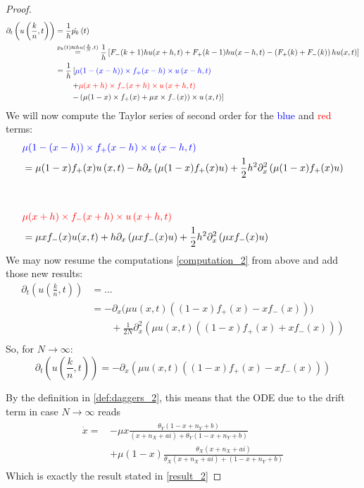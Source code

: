 \begin{proof}
\begin{align}
\begin{split}
	\partial_t \left(u\left(\frac{k}{n}, t\right)\right) &= \frac{1}{h}\dot{p_k}\left(t\right)\\
	&\overset{p_k(t) \approx hu(\frac{k}{N},t)}{=} \frac{1}{h}\left[F_-(k+1)hu(x+h,t) + F_+(k-1)hu(x-h,t) - \left(F_+(k)+F_-(k)\right)hu(x,t)\right]\\
	&= \frac{1}{h}\left[\textcolor{blue}{\mu(1-(x-h))\times f_+(x-h) \times u\left(x-h,t \right)}\right.\\
		&\qquad\left. + \textcolor{red}{\mu(x+h)\times f_-(x+h)\times u\left(x+h,t\right)}\right.\\
		&\qquad\left.- \left(\mu(1-x)\times f_+(x) + \mu x\times f_-(x)\right)\times u\left(x,t\right)\right] 
	\end{split}
	\end{align}
	We will now compute the Taylor series of second order for the \textcolor{blue}{blue} and \textcolor{red}{red} terms:
	\begin{align*}
	&\textcolor{blue}{\mu(1-(x-h))\times f_+(x-h) \times u\left(x-h,t \right)}\\
	&= \mu(1-x)f_+(x) u\left(x,t\right) - h\partial_x \left(\mu(1-x)f_+(x)u\right)+\frac{1}{2}h^2\partial^2_x\left(\mu(1-x)f_+(x)u\right)\\
	&\\
	&\\
	&\textcolor{red}{\mu(x+h)\times f_-(x+h) \times u\left(x+h,t\right)} \\
	&= \mu x f_-(x)u(x,t) + h\partial_x \left(\mu x f_-(x) u\right) + \frac{1}{2}h^2\partial^2_x\left(\mu xf_-(x) u\right)
	\end{align*}
	We may now resume the computations \eqref{computation_2} from above and add those new results:
	\begin{align*}
	\partial_t \left(u\left(\frac{k}{n}, t\right)\right) &= \dots \\
	&= -\partial_x\big(\mu u(x,t)\left((1-x)f_+(x) - xf_-(x)\right)\big)\\
	&\qquad + \frac{1}{2N} \partial^2_x\left(\mu u(x,t)\left((1-x)f_+(x) + xf_-(x)\right)\right)\\
	\end{align*}
	So, for $N \rightarrow \infty$:
	\begin{equation}
		\partial_t \left(u\left(\frac{k}{n}, t\right)\right) = -\partial_x\left(\mu u(x,t)\left((1-x)f_+(x) - xf_-(x)\right)\right)
	\end{equation}

	By the definition in \eqref{def:daggers_2}, this means that the ODE due to the drift term in case $N \rightarrow \infty$ reads 
	\begin{align}
	\begin{split}
	\dot{x} = &-\mu x\frac{\theta_Y(1-x+n_Y+b)}{(x+n_X+ai) + \theta_Y(1-x+n_Y+b)}\\
		\qquad&+ \mu \left(1-x\right)\frac{\theta_X (x+ n_X+ ai)}{\theta_X (x + n_X + ai) + (1-x + n_Y + b)}
	\end{split}
	\end{align}
	Which is exactly the result stated in \eqref{result_2}
\end{proof}